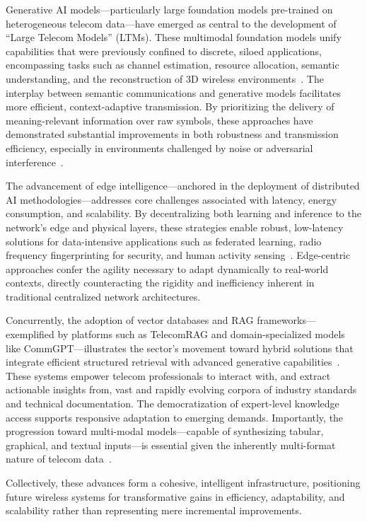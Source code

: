 \documentclass[sigconf]{acmart}
\begin{document}
Generative AI models—particularly large foundation models pre-trained on heterogeneous telecom data—have emerged as central to the development of ``Large Telecom Models'' (LTMs). These multimodal foundation models unify capabilities that were previously confined to discrete, siloed applications, encompassing tasks such as channel estimation, resource allocation, semantic understanding, and the reconstruction of 3D wireless environments~\cite{ref24}. The interplay between semantic communications and generative models facilitates more efficient, context-adaptive transmission. By prioritizing the delivery of meaning-relevant information over raw symbols, these approaches have demonstrated substantial improvements in both robustness and transmission efficiency, especially in environments challenged by noise or adversarial interference~\cite{ref20,ref26}.

The advancement of edge intelligence—anchored in the deployment of distributed AI methodologies—addresses core challenges associated with latency, energy consumption, and scalability. By decentralizing both learning and inference to the network's edge and physical layers, these strategies enable robust, low-latency solutions for data-intensive applications such as federated learning, radio frequency fingerprinting for security, and human activity sensing~\cite{ref12,ref14,ref19,ref21,ref25}. Edge-centric approaches confer the agility necessary to adapt dynamically to real-world contexts, directly counteracting the rigidity and inefficiency inherent in traditional centralized network architectures.

Concurrently, the adoption of vector databases and RAG frameworks—exemplified by platforms such as TelecomRAG and domain-specialized models like CommGPT—illustrates the sector's movement toward hybrid solutions that integrate efficient structured retrieval with advanced generative capabilities~\cite{ref11,ref22,ref23,ref29}. These systems empower telecom professionals to interact with, and extract actionable insights from, vast and rapidly evolving corpora of industry standards and technical documentation. The democratization of expert-level knowledge access supports responsive adaptation to emerging demands. Importantly, the progression toward multi-modal models—capable of synthesizing tabular, graphical, and textual inputs—is essential given the inherently multi-format nature of telecom data~\cite{ref21,ref29}.

Collectively, these advances form a cohesive, intelligent infrastructure, positioning future wireless systems for transformative gains in efficiency, adaptability, and scalability rather than representing mere incremental improvements.
\end{document}
